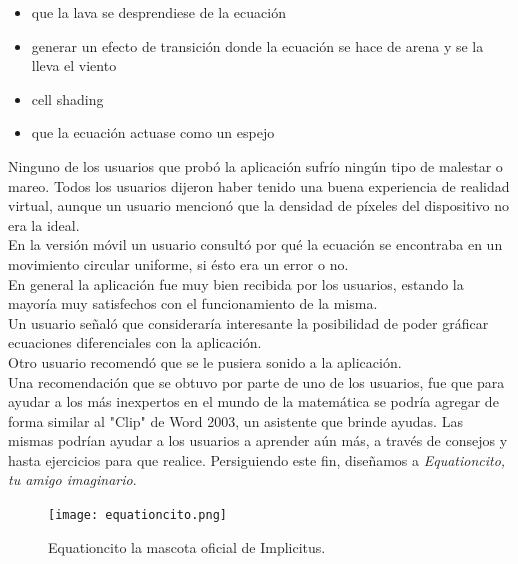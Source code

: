 \documentclass[12pt]{article}
\begin{document}
\begin{itemize}
\item que la lava se desprendiese de la ecuación
\item generar un efecto de transición donde la ecuación se hace de arena y se la lleva el viento
\item cell shading
\item que la ecuación actuase como un espejo
\end{itemize}
Ninguno de los usuarios que probó la aplicación sufrío ningún tipo de malestar o mareo. Todos los usuarios dijeron haber tenido una buena experiencia de realidad virtual, aunque un usuario mencionó que la densidad de píxeles del dispositivo no era la ideal.
\\En la versión móvil un usuario consultó por qué la ecuación se encontraba en un movimiento circular uniforme, si ésto era un error o no.
\\En general la aplicación fue muy bien recibida por los usuarios, estando la mayoría muy satisfechos con el funcionamiento de la misma.
\\Un usuario señaló que consideraría interesante la posibilidad de poder gráficar ecuaciones diferenciales con la aplicación. 
\\Otro usuario recomendó que se le pusiera sonido a la aplicación.
\\Una recomendación que se obtuvo por parte de uno de los usuarios, fue que para ayudar a los más inexpertos en el mundo de la matemática se podría agregar de forma similar al "Clip" de Word 2003, un asistente que brinde ayudas. Las mismas podrían ayudar a los usuarios a aprender aún más, a través de consejos y hasta ejercicios para que realice. Persiguiendo este fin, diseñamos a \textit{Equationcito, tu amigo imaginario}.
\begin{figure}[h]
\texttt{[image: equationcito.png]}
\caption{Equationcito la mascota oficial de Implicitus.}
\end{figure}
\clearpage
\end{document}
